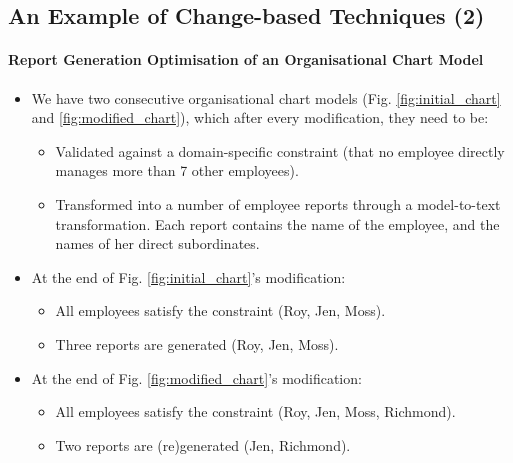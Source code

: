 \documentclass{beamer}
\begin{document}
\begin{frame}
\section{An Example of Change-based Techniques (2)}
\framesubtitle{Report Generation Optimisation of an Organisational Chart Model}
\begin{itemize}
\item We have two consecutive organisational chart models (Fig. \ref{fig:initial_chart} and \ref{fig:modified_chart}), which after every modification, they need to be:
\begin{itemize}
\item Validated against a domain-specific constraint (that no employee directly manages more than 7 other employees).
\item Transformed into a number of employee reports through a model-to-text transformation. Each report contains the name of the employee, and the names of her direct subordinates.
\end{itemize}
\item At the end of Fig. \ref{fig:initial_chart}'s modification:
\begin{itemize}
\item All employees satisfy the constraint (Roy, Jen, Moss).
\item Three reports are generated (Roy, Jen, Moss).
\end{itemize}
\item At the end of Fig. \ref{fig:modified_chart}'s modification:
    \begin{itemize}
    \item All employees satisfy the constraint (Roy, Jen, Moss, Richmond).
    \item Two reports are (re)generated (Jen, Richmond).
\end{itemize}
\end{itemize}
\end{frame}
\end{document}

